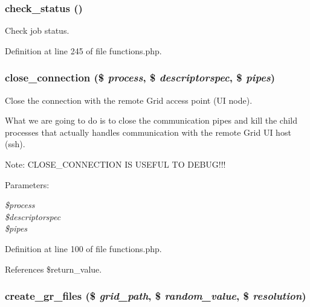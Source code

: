 \subsubsection{\setlength{\rightskip}{0pt plus 5cm}check\_\-status ()}\label{functions_8php_a6}


Check job status. 



Definition at line 245 of file functions.php.
\subsubsection{\setlength{\rightskip}{0pt plus 5cm}close\_\-connection (\$ {\em process}, \$ {\em descriptorspec}, \$ {\em pipes})}\label{functions_8php_a1}


Close the connection with the remote Grid access point (UI node). 

What we are going to do is to close the communication pipes and kill the child processes that actually handles communication with the remote Grid UI host (ssh).

\begin{Desc}
\item[Note:]CLOSE\_\-CONNECTION IS USEFUL TO DEBUG!!!\end{Desc}
\begin{Desc}
\item[Parameters:]
\begin{description}
\item[{\em \$process}]\item[{\em \$descriptorspec}]\item[{\em \$pipes}]\end{description}
\end{Desc}


Definition at line 100 of file functions.php.

References \$return\_\-value.
\subsubsection{\setlength{\rightskip}{0pt plus 5cm}create\_\-gr\_\-files (\$ {\em grid\_\-path}, \$ {\em random\_\-value}, \$ {\em resolution})}\label{functions_8php_a8}


